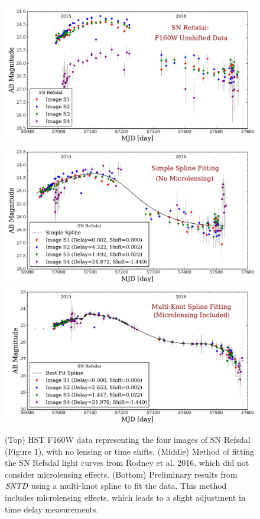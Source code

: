 \begin{figure}[h]

\centering
\includegraphics[width=.74\textwidth]{points_plot_2017.pdf}
\includegraphics[width=.74\textwidth]{refs_plot_2017.pdf}
\includegraphics[width=.74\textwidth]{spline_plot_2017.pdf}
\caption{(Top) HST F160W data representing the four images of SN
Refsdal (Figure 1), with no lensing or time shifts. (Middle) Method of
fitting the SN Refsdal light curves from Rodney et al. 2016, which did
not consider microlensing effects. (Bottom) Preliminary results from 
$\textit{SNTD}$ using a multi-knot spline to fit the data. This method 
includes microlensing effects, which leads to a slight adjustment in 
time delay measurements. }
\end{figure}

\pagebreak





